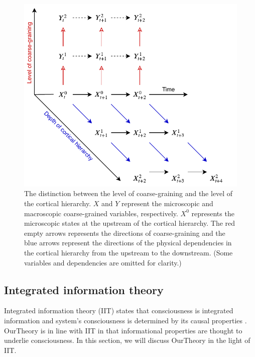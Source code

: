 \documentclass[utf8]{article}
\begin{document}
    		
    		\begin{figure}[H]
    			\includegraphics[width=\textwidth]{WritingMaterials/Fig_SeperationOfCGandCortHierachy/SeperationOfCGandCortHierachy.pdf}
				\caption{The distinction between the level of coarse-graining and the level of the cortical hierarchy. $X$ and $Y$ represent the microscopic and macroscopic coarse-grained  variables, respectively. $X^0$ represents the microscopic states at the upstream of the cortical hierarchy. The red empty arrows represents the directions of coarse-graining and the blue arrows represent the directions of the physical dependencies in the cortical hierarchy from the upstream to the downstream. (Some variables and dependencies are omitted for clarity.)}
				\label{fig:hierarchy}
    		\end{figure} 
    		
        
		\subsection{Integrated information theory}
            Integrated information theory (IIT) states that consciousness is integrated information and system's consciousness is determined by its causal properties \citep{tononi2016integrated}. \ac{OurTheory} is in line with IIT in that informational properties are thought to underlie consciousness. In this section, we will discuss \ac{OurTheory} in the light of IIT. 
            
\end{document}
